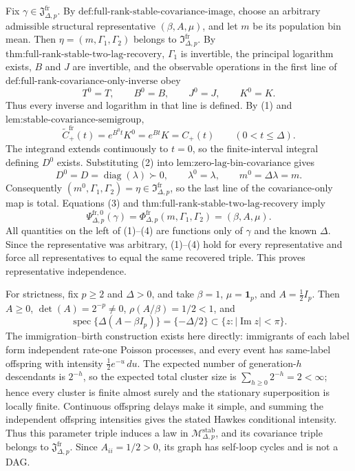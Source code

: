 Fix \(\gamma\in\mathfrak J_{\Delta,p}^{\mathrm{fr}}\).  By \(\text{def:full-rank-stable-covariance-image}\), choose an arbitrary admissible structural representative \((\beta,A,\mu)\), and let \(m\) be its population bin mean.  Then \(\eta=(m,\Gamma_1,\Gamma_2)\) belongs to \(\mathfrak I_{\Delta,p}^{\mathrm{fr}}\).  By \(\text{thm:full-rank-stable-two-lag-recovery}\), \(\Gamma_1\) is invertible, the principal logarithm exists, \(B\) and \(J\) are invertible, and the observable operations in the first line of \(\text{def:full-rank-covariance-only-inverse}\) obey
\[
 T^0=T,\qquad B^0=B,\qquad J^0=J,\qquad K^0=K.
\tag{1}
\]
Thus every inverse and logarithm in that line is defined.  By (1) and \(\text{lem:stable-covariance-semigroup}\),
\[
 \widetilde C_{+}^{\mathrm{fr}}(t)=e^{B^0t}K^0=e^{Bt}K=C_{+}(t)
 \qquad(0<t\leq\Delta).
\tag{2}
\]
The integrand extends continuously to \(t=0\), so the finite-interval integral defining \(D^0\) exists.  Substituting (2) into \(\text{lem:zero-lag-bin-covariance}\) gives
\[
 D^0=D=\operatorname{diag}(\lambda)\succ0,\qquad
 \lambda^0=\lambda,\qquad m^0=\Delta\lambda=m.
\tag{3}
\]
Consequently \((m^0,\Gamma_1,\Gamma_2)=\eta\in\mathfrak I_{\Delta,p}^{\mathrm{fr}}\), so the last line of the covariance-only map is total.  Equations (3) and \(\text{thm:full-rank-stable-two-lag-recovery}\) imply
\[
 \Psi_{\Delta,p}^{\mathrm{fr},0}(\gamma)
 =\Phi_{\Delta,p}^{\mathrm{fr}}(m,\Gamma_1,\Gamma_2)
 =(\beta,A,\mu).
\tag{4}
\]
All quantities on the left of (1)--(4) are functions only of \(\gamma\) and the known \(\Delta\).  Since the representative was arbitrary, (1)--(4) hold for every representative and force all representatives to equal the same recovered triple.  This proves representative independence.

For strictness, fix \(p\geq2\) and \(\Delta>0\), and take \(\beta=1\), \(\mu=\mathbf 1_p\), and \(A=\tfrac12 I_p\).  Then \(A\geq0\), \(\det(A)=2^{-p}\neq0\), \(\rho(A/\beta)=1/2<1\), and
\[
 \operatorname{spec}\{\Delta(A-\beta I_p)\}=\{-\Delta/2\}
 \subset\{z:|\operatorname{Im}z|<\pi\}.
\tag{5}
\]
The immigration--birth construction exists here directly: immigrants of each label form independent rate-one Poisson processes, and every event has same-label offspring with intensity \(\tfrac12e^{-u}\,du\).  The expected number of generation-\(h\) descendants is \(2^{-h}\), so the expected total cluster size is \(\sum_{h\geq0}2^{-h}=2<\infty\); hence every cluster is finite almost surely and the stationary superposition is locally finite.  Continuous offspring delays make it simple, and summing the independent offspring intensities gives the stated Hawkes conditional intensity.  Thus this parameter triple induces a law in \(\mathcal M_{\Delta,p}^{\mathrm{stab}}\), and its covariance triple belongs to \(\mathfrak J_{\Delta,p}^{\mathrm{fr}}\).  Since \(A_{ii}=1/2>0\), its graph has self-loop cycles and is not a DAG.